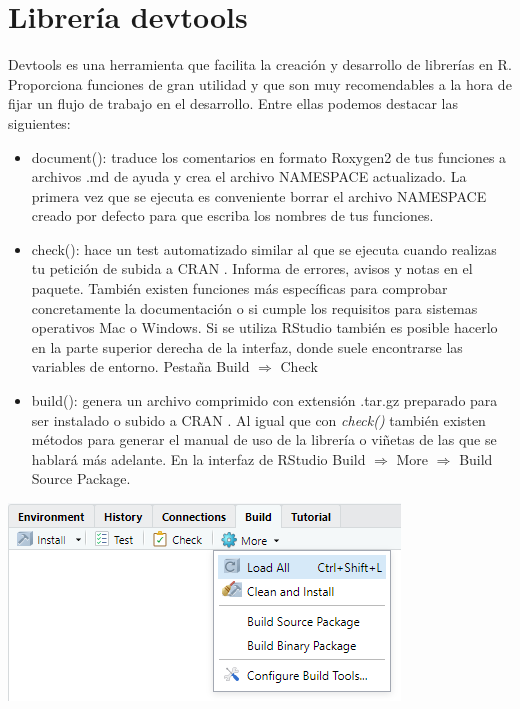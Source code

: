 \section{Librería devtools}
Devtools \cite{devtools} es una herramienta que facilita la creación y desarrollo de librerías en R. Proporciona funciones de gran utilidad y que son muy recomendables a la hora de fijar un flujo de trabajo en el desarrollo. Entre ellas podemos destacar las siguientes:\\
\begin{itemize}[label=$\bullet$, font=\bfseries]
    \item document(): traduce los comentarios en formato Roxygen2 \cite{Roxygen2} de tus funciones a archivos .md de ayuda y crea el archivo NAMESPACE actualizado. La primera vez que se ejecuta es conveniente borrar el archivo NAMESPACE creado por defecto para que escriba los nombres de tus funciones.
    
    \item check(): hace un test automatizado similar al que se ejecuta cuando realizas tu petición de subida a CRAN \cite{CRAN}. Informa de errores, avisos y notas en el paquete. También existen funciones más específicas para comprobar concretamente la documentación o si cumple los requisitos para sistemas operativos Mac o Windows. Si se utiliza RStudio también es posible hacerlo en la parte superior derecha de la interfaz, donde suele encontrarse las variables de entorno. Pestaña Build $\Rightarrow$ Check 
    
    \item build(): genera un archivo comprimido con extensión .tar.gz preparado para ser instalado o subido a CRAN \cite{CRAN}. Al igual que con \textit{check()} también existen métodos para generar el manual de uso de la librería o viñetas de las que se hablará más adelante. En la interfaz de RStudio Build $\Rightarrow$ More $\Rightarrow$ Build Source Package.
\end{itemize}

\begin{center}
    \includegraphics[scale=0.7]{img/build.png}
    \label{fig:build}
\end{center}

